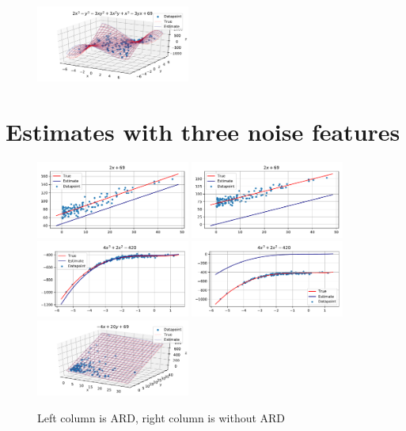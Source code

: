 \documentclass[12pt]{article}
\begin{document}
\begin{figure}[H]
            \includegraphics[width=0.45\textwidth]{f_8_noise0_estplot_regular}
        \end{figure}
    \section{Estimates with three noise features}
        \begin{figure}[H]
            \centering
            \caption{Left column is ARD, right column is without ARD} \label{fig:appendixestimates2}
            \includegraphics[width=0.45\textwidth]{f_1_noise3_estplot_ard}
            \includegraphics[width=0.45\textwidth]{f_1_noise3_estplot_regular}
            \includegraphics[width=0.45\textwidth]{f_2_noise3_estplot_ard}
            \includegraphics[width=0.45\textwidth]{f_2_noise3_estplot_regular}
            \includegraphics[width=0.45\textwidth]{f_3_noise3_estplot_ard}

\end{figure}
\end{document}
